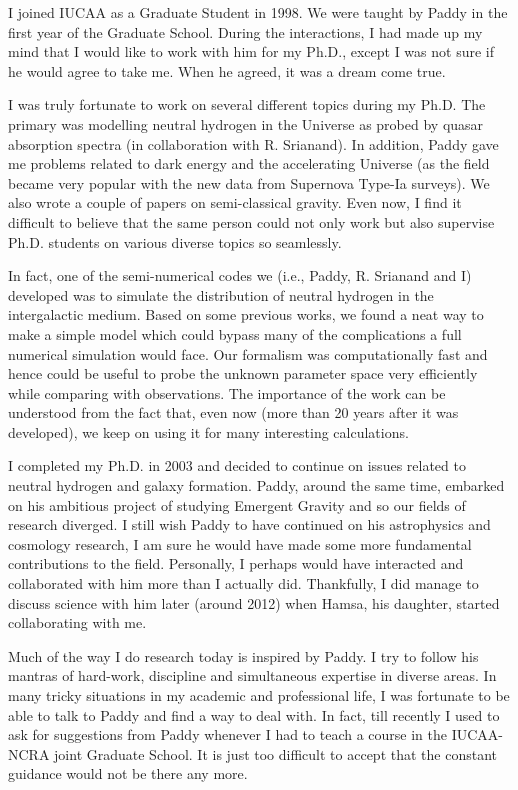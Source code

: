 \documentclass[prd, preprint, longbibliography, 12pt]{revtex4-2}
\begin{document}
I joined IUCAA as a Graduate Student in 1998. We were taught by Paddy in the first year of the Graduate School. During the interactions, I had made up my mind that I would like to work with him for my Ph.D., except I was not sure if he would agree to take me. When he agreed, it was a dream come true.

I was truly fortunate to work on several different topics during my Ph.D. The primary was modelling neutral hydrogen in the Universe as probed by quasar absorption spectra (in collaboration with R. Srianand). In addition, Paddy gave me problems related to dark energy and the accelerating Universe (as the field became very popular with the new data from Supernova Type-Ia surveys). We also wrote a couple of papers on semi-classical gravity. Even now, I find it difficult to believe that the same person could not only work but also supervise Ph.D. students on various diverse topics so seamlessly.

In fact, one of the semi-numerical codes we (i.e., Paddy, R. Srianand and I) developed was to simulate the distribution of neutral hydrogen in the intergalactic medium. Based on some previous works, we found a neat way to make a simple model which could bypass many of the complications a full numerical simulation would face. Our formalism was computationally fast and hence could be useful to probe the unknown parameter space very efficiently while comparing with observations. The importance of the work can be understood from the fact that, even now (more than 20 years after it was developed), we keep on using it for many interesting calculations.

I completed my Ph.D. in 2003 and decided to continue on issues related to neutral hydrogen and galaxy formation. Paddy, around the same time, embarked on his ambitious project of studying Emergent Gravity and so our fields of research diverged. I still wish Paddy to have continued on his astrophysics and cosmology research, I am sure he would have made some more fundamental contributions to the field. Personally, I perhaps would have interacted and collaborated with him more than I actually did. Thankfully, I did manage to discuss science with him later (around 2012) when Hamsa, his daughter, started collaborating with me.

Much of the way I do research today is inspired by Paddy. I try to follow his mantras of hard-work, discipline and simultaneous expertise in diverse areas. In many tricky situations in my academic and professional life, I was fortunate to be able to talk to Paddy and find a way to deal with. In fact, till recently I used to ask for suggestions from Paddy whenever I had to teach a course in the IUCAA-NCRA joint Graduate School. It is just too difficult to accept that the constant guidance would not be there any more.
\end{document}
